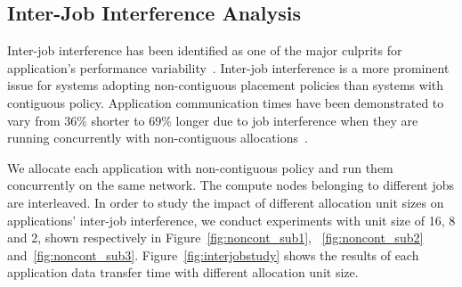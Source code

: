 



\subsection{Inter-Job Interference Analysis}
\label{sec: interjob interference study}

Inter-job interference has been identified as one of the major culprits 
for application's performance variability~\cite{abhinav-sc13,skinner}. 
Inter-job interference is a more prominent issue for systems adopting 
non-contiguous placement policies than systems with contiguous policy. 
Application communication times have been demonstrated to 
vary from 36\% shorter to 69\% longer due to job interference 
when they are running concurrently with non-contiguous allocations~\cite{abhinav-sc13}.

We allocate each application with non-contiguous policy and 
run them concurrently on the same network. 
The compute nodes belonging to different jobs are interleaved. 
In order to study the impact of different allocation unit sizes on 
applications' inter-job interference, 
we conduct experiments with unit size of 16, 8 and 2, 
shown respectively in Figure~\ref{fig:noncont_sub1}, 
~\ref{fig:noncont_sub2} and~\ref{fig:noncont_sub3}. 
Figure~\ref{fig:interjobstudy} shows the results of each application 
data transfer time with different allocation unit size. 

